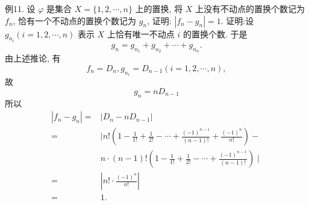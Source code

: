 例11. 设 $\varphi$ 是集合 $X=\{1,2, \cdots, n\}$ 上的置换, 将 $X$ 上没有不动点的置换个数记为 $f_n$, 恰有一个不动点的置换个数记为 $g_n$, 证明: $\left|f_n-g_n\right|=1$. 
证明:设 $g_{n_i}(i=1,2, \cdots, n)$ 表示 $X$ 上恰有唯一不动点 $i$ 的置换个数.
于是
$$
g_n=g_{n_1}+g_{n_2}+\cdots+g_{n_n} .
$$
由上述推论, 有
$$
f_n=D_n, g_{n_i}=D_{n-1}(i=1,2, \cdots, n),
$$
故
$$
g_n=n D_{n-1}
$$
所以
$$
\begin{aligned}
\left|f_n-g_n\right|= & \left|D_n-n D_{n-1}\right| \\
= & \mid n !\left(1-\frac{1}{1 !}+\frac{1}{2 !}-\cdots+\frac{(-1)^{n-1}}{(n-1) !}+\frac{(-1)^n}{n !}\right)- \\
& n \cdot(n-1) !\left(1-\frac{1}{1 !}+\frac{1}{2 !}-\cdots+\frac{(-1)^{n-1}}{(n-1) !}\right) \mid \\
= & \left|n ! \cdot \frac{(-1)^n}{n !}\right| \\
= & 1 .
\end{aligned}
$$



